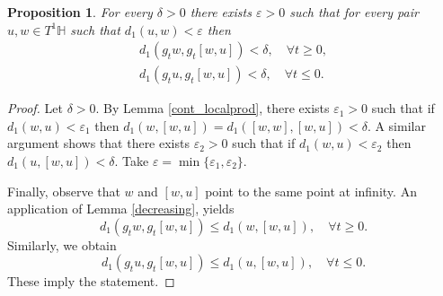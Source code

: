 \documentclass[a4paper,english,reqno]{amsart}
\renewcommand{\H}{\mathbb{H}}
\newtheorem{proposition}{Proposition}
\theoremstyle{definition}
\numberwithin{equation}{section}
\begin{document}
\begin{proposition}\label{distancelp}
	For every $\delta>0$ there exists $\varepsilon>0$ such that for every pair $u,w \in T^1 \H$ such that $d_1(u,w) <\varepsilon $ then 
	\begin{align*}
		d_1(g_t w , g_t [w,u] ) <\delta, \quad \forall t\ge 0 ,\\
		d_1(g_t u , g_t [w,u] ) <\delta, \quad \forall t\le 0 . 
	\end{align*}
\end{proposition}

\begin{proof}
	Let $\delta>0$. 
	By Lemma \ref{cont_localprod}, there exists $\varepsilon_1>0$ such that if $d_1(w,u)<\varepsilon_1$ then $d_1(w, [w,u]) = d_1([w,w], [w,u])<\delta$. A similar argument shows that there exists $\varepsilon_2>0$ such that if $d_1(w,u)<\varepsilon_2$ then $d_1(u, [w,u]) <\delta$. Take $\varepsilon=\min\{\varepsilon_1,\varepsilon_2\}$.
	
	Finally, observe that $w$ and $[w,u]$ point to the same point at infinity. An application of Lemma \ref{decreasing}, yields 
	\[
	d_1(g_t w , g_t [w,u] ) \le d_1( w , [w,u] ), \quad \forall t\ge 0.
	\]
	Similarly, we obtain
	\[
	d_1(g_t u , g_t [w,u] ) \le d_1( u , [w,u] ), \quad  \forall t\le 0.
	\]
	These imply the statement.
\end{proof}

%
\end{document}
